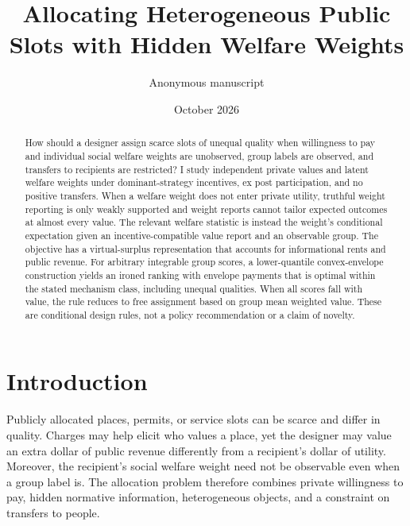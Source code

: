 \documentclass[11pt]{article}
\title{Allocating Heterogeneous Public Slots with Hidden Welfare Weights}
\author{Anonymous manuscript}
\date{October 2026}
\begin{document}
\maketitle

\begin{abstract}
How should a designer assign scarce slots of unequal quality when willingness to pay and individual social welfare weights are unobserved, group labels are observed, and transfers to recipients are restricted? I study independent private values and latent welfare weights under dominant-strategy incentives, ex post participation, and no positive transfers. When a welfare weight does not enter private utility, truthful weight reporting is only weakly supported and weight reports cannot tailor expected outcomes at almost every value. The relevant welfare statistic is instead the weight's conditional expectation given an incentive-compatible value report and an observable group. The objective has a virtual-surplus representation that accounts for informational rents and public revenue. For arbitrary integrable group scores, a lower-quantile convex-envelope construction yields an ironed ranking with envelope payments that is optimal within the stated mechanism class, including unequal qualities. When all scores fall with value, the rule reduces to free assignment based on group mean weighted value. These are conditional design rules, not a policy recommendation or a claim of novelty.
\end{abstract}

\section{Introduction}

Publicly allocated places, permits, or service slots can be scarce and differ in quality. Charges may help elicit who values a place, yet the designer may value an extra dollar of public revenue differently from a recipient's dollar of utility. Moreover, the recipient's social welfare weight need not be observable even when a group label is. The allocation problem therefore combines private willingness to pay, hidden normative information, heterogeneous objects, and a constraint on transfers to people.
\end{document}
